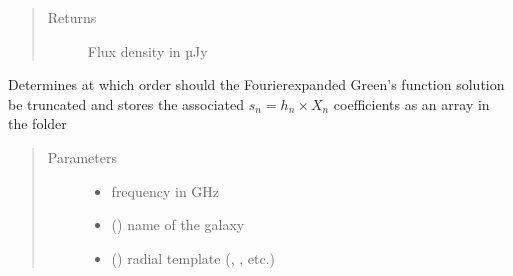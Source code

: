 \documentclass[letterpaper,10pt,english]{sphinxmanual}
\begin{document}
\begin{fulllineitems}
\begin{quote}
\begin{description}
\begin{itemize}
\end{itemize}

\item[{Returns}] \leavevmode
\sphinxAtStartPar
Flux density in µJy

\end{description}\end{quote}

\end{fulllineitems}


\begin{fulllineitems}
\label{\detokenize{diffsph:diffsph.pyflux.which_N}}
\sphinxAtStartPar
Determines at which order should the Fourier\sphinxhyphen{}expanded Green’s function solution be truncated and stores the associated \(s_n = h_n\times X_n\) coefficients as an array in the  folder
\begin{quote}\begin{description}
\item[{Parameters}] \leavevmode\begin{itemize}
\item {} 
\sphinxAtStartPar
{} \textendash{} frequency in GHz

\item {} 
\sphinxAtStartPar
{} () \textendash{} name of the galaxy

\item {} 
\sphinxAtStartPar
{} () \textendash{} radial template (, , etc.)


\end{itemize}
\end{description}
\end{quote}
\end{fulllineitems}
\end{document}
